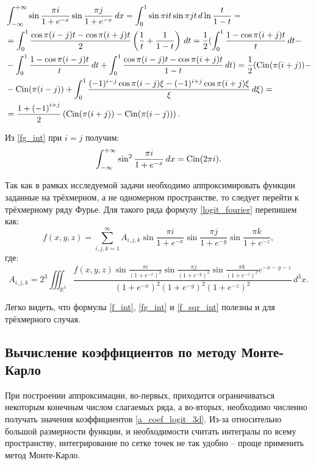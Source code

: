 \begin{align}
	&\int_{-\infty}^{+\infty}\sin{\frac{\pi i}{1+e^{-x}}}\sin{\frac{\pi j}{1+e^{-x}}} \, dx = \int_0^1\sin{\pi it}\sin{\pi jt} \, d\ln{\frac{t}{1-t}} = \notag \\
	&= \int_0^1\frac{\cos\pi (i-j)t - \cos\pi (i+j)t}{2}\left(\frac{1}{t} + \frac{1}{1-t}\right)\, dt = \frac{1}{2}(\int_0^1\frac{1-\cos\pi (i+j)t}{t}\, dt - \notag \\
	&- \int_0^1\frac{1-\cos\pi (i-j)t}{t}\, dt + \int_0^1\frac{\cos\pi (i-j)t-\cos\pi (i+j)t}{1-t}\, dt) = \frac{1}{2}(\operatorname{Cin}(\pi(i+j)) -\notag \\
	&- \operatorname{Cin}(\pi(i-j)) + \int_0^1\frac{{(-1)^{i-j}}\cos\pi(i-j)\xi - {(-1)^{i+j}}\cos\pi(i+j)\xi}{\xi}\, d\xi) = \notag \\
	&= \frac{1+{(-1)}^{i+j}}{2}\left(\operatorname{Cin}(\pi(i+j)) - \operatorname{Cin}(\pi(i-j))\right).
	\label{fg_int}
\end{align}

Из \ref{fg_int} при $i=j$ получим:
\begin{equation}
	\int_{-\infty}^{+\infty}\sin^2\frac{\pi i}{1+e^{-x}}\, dx = \operatorname{Cin}(2\pi i).
	\label{f_sqr_int}
\end{equation}

Так как в рамках исследуемой задачи необходимо аппроксимировать функции заданные на трёхмерном, а не одномерном пространстве, то следует перейти к трёхмерному ряду Фурье.
Для такого ряда формулу \ref{logit_fourier} перепишем как:
\begin{equation}
	f(x,y,z) = \sum_{i,j,k=1}^\infty A_{i,j,k}\sin{\frac{\pi i}{1 + e^{-x}}}\sin{\frac{\pi j}{1 + e^{-y}}}\sin{\frac{\pi k}{1 + e^{-z}}},
	\label{logit_fourier_3d}
\end{equation}
где:
\begin{equation}
	A_{i,j,k} = 2^3\iiint_{\mathbb{R}^3}\frac{f(x, y, z)\sin\frac{\pi i}{(1+e^{-x})^2}\sin\frac{\pi j}{(1+e^{-y})^2}\sin\frac{\pi k}{(1+e^{-z})^2}e^{-x-y-z}}{(1+e^{-x})^2(1+e^{-y})^2(1+e^{-z})^2}\, d^3x.
	\label{a_coef_logit_3d}
\end{equation}

Легко видеть, что формулы \ref{f_int}, \ref{fg_int} и \ref{f_sqr_int} полезны и для трёхмерного случая.

\subsection{Вычисление коэффициентов по методу Монте-Карло}

При построении аппроксимации, во-первых, приходится ограничиваться некоторым конечным числом слагаемых ряда, а во-вторых, необходимо численно получать значения коэффициентов \ref{a_coef_logit_3d}. Из-за относительно большой размерности функции, и необходимости считать интегралы по всему пространству, интегрирование по сетке точек не так удобно -- проще применить метод Монте-Карло.

